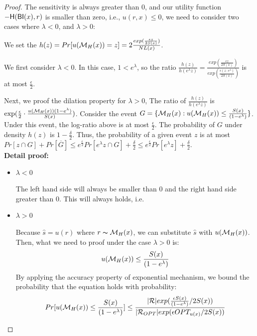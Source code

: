 \begin{proof}

The sensitivity is always greater than 0, and our utility function $-\mathsf{H}(\mathsf{BI}(x),r)$ is smaller than zero, i.e., $u(r,x) \leq 0$, we need to consider two cases where $\lambda < 0$, and $\lambda > 0$:

We set the $h(z) = Pr[u(\mathcal{M}_H(x)) = z] = 2\frac{exp(\frac{\epsilon z}{2 S(x)})}{NL(x)}$.

We first consider $\lambda < 0$. In this case, $1 < e ^ {\lambda}$, so the ratio $\frac{h(z)}{h(e^{\lambda}z)} = \frac{exp(\frac{\epsilon z}{2 S(x)})}{exp(\frac{\epsilon (z \cdot e^{\lambda})}{2 S(x)})}$ is at most $\frac{\epsilon}{2}$.

Next, we proof the dilation property for $\lambda > 0$, The ratio of $\frac{h(z)}{h(e^{\lambda}z)}$ is $\exp(\frac{\epsilon}{2} \cdot \frac{u(\mathcal{M}_H(x)) (1 - e^{\lambda})}{S(x)})$. Consider the event $G = \{ \mathcal{M}_H(x) : u(\mathcal{M}_H(x)) \leq \frac{S(x)}{(1 - e^{\lambda})}\}$. Under this event, the log-ratio above is at most $\frac{\epsilon}{2}$. The probability of $G$ under density $h(z)$ is $1 - \frac{\delta}{2}$. Thus, the probability of a given event $z$ is at most $Pr[z \cap G] + Pr[\overline{G}] \leq e^{\frac{\epsilon}{2}} Pr[e^{\lambda}z \cap G] + \frac{\delta}{2} \leq e^{\frac{\epsilon}{2}} Pr[e^{\lambda}z] + \frac{\delta}{2}$.\\


\textbf{Detail proof:}
\begin{itemize}

	\item $\lambda < 0$

		The left hand side will always be smaller than 0 and the right hand side greater than 0. This will always holds, i.e.
		\begin{equation*}
		\end{equation*}
	\item $\lambda > 0$


Because $\hat{s} = u(r)$ where $r \thicksim \mathcal{M}_H(x)$, we can substitute $\hat{s}$ with $u(\mathcal{M}_H(x))$. Then, what we need to proof under the case $\lambda > 0$ is:
\begin{equation*}
u(\mathcal{M}_H(x)) \leq \frac{S(x)}{(1 - e ^ {\lambda})}
\end{equation*}
By applying the accuracy property of exponential mechanism, we bound the probability that the equation holds with probability:
\begin{equation*}
\begin{split}
Pr[u(\mathcal{M}_H(x)) \leq \frac{S(x)}{(1 - e ^ {\lambda})}] 
& \leq \frac{|\mathcal{R}|exp(\frac{\epsilon S(x)}{(1 - e ^ {\lambda})}/2 S(x))}{|\mathcal{R}_{OPT}| exp(\epsilon OPT_{u(x)}/2 S(x))}\\
\end{split}
\end{equation*}


\end{itemize}
\end{proof}

